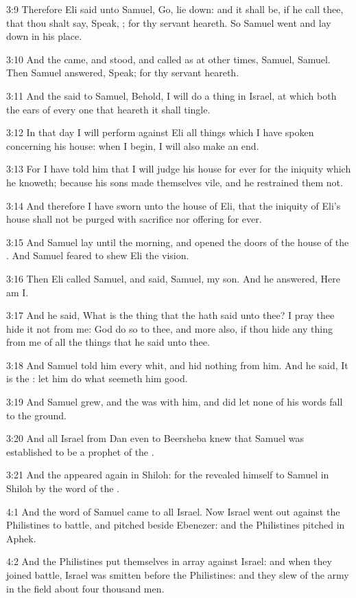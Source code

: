 3:9 Therefore Eli said unto Samuel, Go, lie down: and it shall be, if
he call thee, that thou shalt say, Speak, \LORD; for thy servant
heareth. So Samuel went and lay down in his place.

3:10 And the \LORD came, and stood, and called as at other times,
Samuel, Samuel. Then Samuel answered, Speak; for thy servant heareth.

3:11 And the \LORD said to Samuel, Behold, I will do a thing in Israel,
at which both the ears of every one that heareth it shall tingle.

3:12 In that day I will perform against Eli all things which I have
spoken concerning his house: when I begin, I will also make an end.

3:13 For I have told him that I will judge his house for ever for the
iniquity which he knoweth; because his sons made themselves vile, and
he restrained them not.

3:14 And therefore I have sworn unto the house of Eli, that the
iniquity of Eli's house shall not be purged with sacrifice nor
offering for ever.

3:15 And Samuel lay until the morning, and opened the doors of the
house of the \LORD. And Samuel feared to shew Eli the vision.

3:16 Then Eli called Samuel, and said, Samuel, my son. And he
answered, Here am I.

3:17 And he said, What is the thing that the \LORD hath said unto thee?
I pray thee hide it not from me: God do so to thee, and more also, if
thou hide any thing from me of all the things that he said unto thee.

3:18 And Samuel told him every whit, and hid nothing from him. And he
said, It is the \LORD: let him do what seemeth him good.

3:19 And Samuel grew, and the \LORD was with him, and did let none of
his words fall to the ground.

3:20 And all Israel from Dan even to Beersheba knew that Samuel was
established to be a prophet of the \LORD.

3:21 And the \LORD appeared again in Shiloh: for the \LORD revealed
himself to Samuel in Shiloh by the word of the \LORD.

4:1 And the word of Samuel came to all Israel. Now Israel went out
against the Philistines to battle, and pitched beside Ebenezer: and
the Philistines pitched in Aphek.

4:2 And the Philistines put themselves in array against Israel: and
when they joined battle, Israel was smitten before the Philistines:
and they slew of the army in the field about four thousand men.

